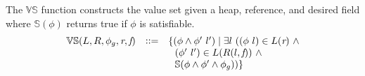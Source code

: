 \begin{definition}
\label{def:VS}
The $\mathbb{VS}$ function constructs the value set given a
heap, reference, and desired field where $\mathbb{S}(\phi)$ returns true if $\phi$ is satisfiable.
\[
\begin{array}{rcl}
  \mathbb{VS}(L,R,\phi_g,\emph{r},\emph{f}) & \vcentcolon \vcentcolon= &
  \{(\phi\wedge\phi^\prime\ l^\prime) \mid \exists
  l\ ((\phi\ l) \in L(\emph{r})\ \wedge \\ & &
  \ \ (\phi^\prime\ l^\prime) \in L(R(l,\emph{f}))\ \wedge \\ & &
  \ \ \mathbb{S}(\phi\wedge\phi^\prime\wedge \phi_g))\}
\end{array}
\]
\end{definition}
